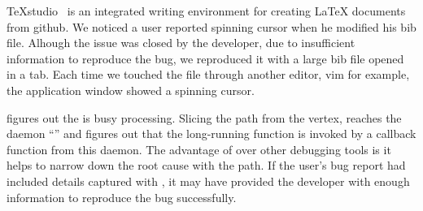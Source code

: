 TeXstudio~\cite{texstudio} is an integrated writing environment for creating
LaTeX documents from github. We noticed a user reported spinning cursor when he
modified his bib file. Alhough the issue was closed by the developer, due to insufficient
information to reproduce the bug, we reproduced it with a large bib file opened in
a tab. Each time we touched the file through another editor, vim for example, the
application window showed a spinning cursor.

\xxx figures out the \spinningnode is busy processing. Slicing the path from
the vertex, \xxx reaches the daemon ``'' and figures out that the long-running function
is invoked by a callback function from this daemon. The advantage of
\xxx over other debugging tools is it helps to narrow down the root cause with
the path. If the user's bug report had included details captured with \xxx, it may have provided
the developer with enough information to reproduce the bug successfully.

